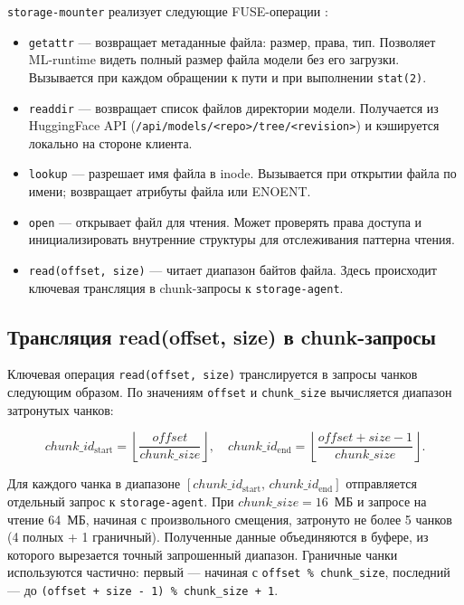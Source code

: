 \texttt{storage-mounter} реализует следующие FUSE-операции \cite{gofuse}:

\begin{itemize}[leftmargin=*]
  \item \texttt{getattr} --- возвращает метаданные файла: размер, права, тип. Позволяет ML-runtime видеть полный размер файла модели без его загрузки. Вызывается при каждом обращении к пути и при выполнении \texttt{stat(2)}.
  \item \texttt{readdir} --- возвращает список файлов директории модели. Получается из HuggingFace API (\texttt{/api/models/<repo>/tree/<revision>}) и кэшируется локально на стороне клиента.
  \item \texttt{lookup} --- разрешает имя файла в inode. Вызывается при открытии файла по имени; возвращает атрибуты файла или ENOENT.
  \item \texttt{open} --- открывает файл для чтения. Может проверять права доступа и инициализировать внутренние структуры для отслеживания паттерна чтения.
  \item \texttt{read(offset, size)} --- читает диапазон байтов файла. Здесь происходит ключевая трансляция в chunk-запросы к \texttt{storage-agent}.
\end{itemize}

\subsection*{Трансляция read(offset, size) в chunk-запросы}

Ключевая операция \texttt{read(offset, size)} транслируется в запросы чанков следующим образом. По значениям \texttt{offset} и \texttt{chunk\_size} вычисляется диапазон затронутых чанков:

\begin{equation}
chunk\_id_{\mathrm{start}} = \left\lfloor \frac{offset}{chunk\_size} \right\rfloor, \quad
chunk\_id_{\mathrm{end}} = \left\lfloor \frac{offset + size - 1}{chunk\_size} \right\rfloor.
\label{eq:chunk_range}
\end{equation}

Для каждого чанка в диапазоне $[chunk\_id_{\mathrm{start}},\, chunk\_id_{\mathrm{end}}]$ отправляется отдельный запрос к \texttt{storage-agent}. При $chunk\_size = 16$~МБ и запросе на чтение 64~МБ, начиная с произвольного смещения, затронуто не более 5 чанков (4 полных + 1 граничный). Полученные данные объединяются в буфере, из которого вырезается точный запрошенный диапазон. Граничные чанки используются частично: первый --- начиная с \texttt{offset \% chunk\_size}, последний --- до \texttt{(offset + size - 1) \% chunk\_size + 1}.

